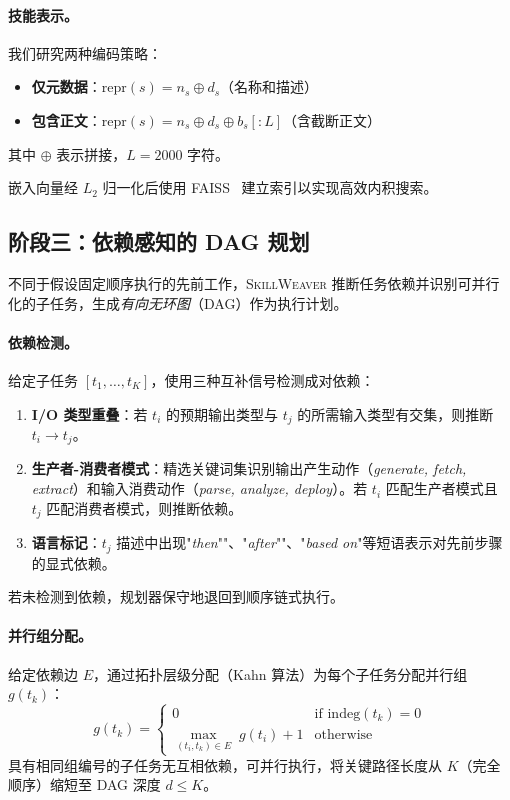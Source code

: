 \documentclass[11pt,a4paper]{ctexart}
\newcommand{\system}{\textsc{SkillWeaver}}
\begin{document}
\paragraph{技能表示。}
我们研究两种编码策略：
\begin{itemize}[nosep,leftmargin=*]
  \item \textbf{仅元数据}：$\text{repr}(s) = n_s \oplus d_s$（名称和描述）
  \item \textbf{包含正文}：$\text{repr}(s) = n_s \oplus d_s \oplus b_s[:L]$（含截断正文）
\end{itemize}
其中 $\oplus$ 表示拼接，$L=2000$ 字符。

嵌入向量经 $L_2$ 归一化后使用 FAISS~\citep{johnson2019faiss} 建立索引以实现高效内积搜索。

\subsection{阶段三：依赖感知的 DAG 规划}
\label{sec:compose}

不同于假设固定顺序执行的先前工作，\system{} 推断任务依赖并识别可并行化的子任务，生成\emph{有向无环图}（DAG）作为执行计划。

\paragraph{依赖检测。}
给定子任务 $[t_1, \ldots, t_K]$，使用三种互补信号检测成对依赖：
\begin{enumerate}[nosep,leftmargin=*]
  \item \textbf{I/O 类型重叠}：若 $t_i$ 的预期输出类型与 $t_j$ 的所需输入类型有交集，则推断 $t_i \to t_j$。
  \item \textbf{生产者-消费者模式}：精选关键词集识别输出产生动作（\emph{generate, fetch, extract}）和输入消费动作（\emph{parse, analyze, deploy}）。若 $t_i$ 匹配生产者模式且 $t_j$ 匹配消费者模式，则推断依赖。
  \item \textbf{语言标记}：$t_j$ 描述中出现"\emph{then}""、"\emph{after}""、"\emph{based on}"等短语表示对先前步骤的显式依赖。
\end{enumerate}
若未检测到依赖，规划器保守地退回到顺序链式执行。

\paragraph{并行组分配。}
给定依赖边 $E$，通过拓扑层级分配（Kahn 算法）为每个子任务分配并行组 $g(t_k)$：
\begin{equation}
g(t_k) = \begin{cases} 0 & \text{if } \text{indeg}(t_k) = 0 \\ \max_{(t_i, t_k) \in E}\; g(t_i) + 1 & \text{otherwise} \end{cases}
\label{eq:parallel}
\end{equation}
具有相同组编号的子任务无互相依赖，可并行执行，将关键路径长度从 $K$（完全顺序）缩短至 DAG 深度 $d \leq K$。
\end{document}
